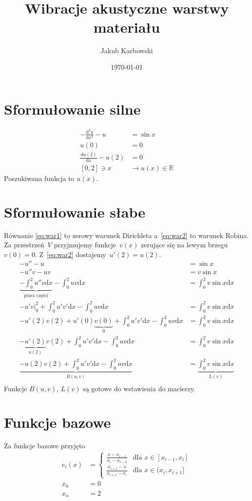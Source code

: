 \documentclass[12pt,a4paper]{mwart}
\begin{document}
\title{Wibracje akustyczne warstwy materiału}
\author{Jakub Karbowski}
\date{\today}
\maketitle


\section{Sformułowanie silne}
\begin{align}
    \label{eq:main}
    -\frac{\mathrm{d}^2u}{\mathrm{d}x^2} - u &= \sin x \\
    \label{eq:war1}
    u(0) &= 0 \\
    \label{eq:war2}
    \frac{\mathrm{d}u(2)}{\mathrm{d}x} - u(2) &= 0 \\
    [0,2] \ni x &\to u(x) \in \mathbb{R} \nonumber
\end{align}
Poszukiwana funkcja to $u(x)$.

\section{Sformułowanie słabe}
Równanie \eqref{eq:war1} to zerowy warunek Dirichleta
a~\eqref{eq:war2} to warunek Robina.
Za przestrzeń~$V$ 
przyjmujemy funkcje~$v(x)$ zerujące się na lewym brzegu
$v(0)=0$.
Z~\eqref{eq:war2} dostajemy~$u'(2)=u(2)$.
\begin{align*}
    -u'' - u &= \sin x \\
    -u''v - uv &= v\sin x \\
    \underbrace{-\int_0^2u''v\mathrm{d}x}_\text{przez części} - \int_0^2uv\mathrm{d}x &= \int_0^2v\sin x\mathrm{d}x \\
    -u'v\big|_0^2 + \int_0^2u'v'\mathrm{d}x - \int_0^2uv\mathrm{d}x &= \int_0^2v\sin x\mathrm{d}x \\
    -u'(2)v(2) + u'(0)\underbrace{v(0)}_0 + \int_0^2u'v'\mathrm{d}x - \int_0^2uv\mathrm{d}x &= \int_0^2v\sin x\mathrm{d}x \\
    -\underbrace{u'(2)}_{u(2)}v(2) + \int_0^2u'v'\mathrm{d}x - \int_0^2uv\mathrm{d}x &= \int_0^2v\sin x\mathrm{d}x \\
    \underbrace{-u(2)v(2) + \int_0^2u'v'\mathrm{d}x - \int_0^2uv\mathrm{d}x}_{B(u,v)} &= \underbrace{\int_0^2v\sin x\mathrm{d}x}_{L(v)} \\
\end{align*}
Funkcje $B(u,v)$, $L(v)$ są gotowe do wstawienia do macierzy.

\section{Funkcje bazowe}
Za funkcje bazowe przyjęto
\begin{align*}
    e_i(x) &= \begin{cases}
        \frac{x - x_{i-1}}{x_i - x_{i-1}} & \text{dla $x\in[x_{i-1},x_i]$} \\
        \frac{x_{i+1} - x}{x_{i+1} - x_i} & \text{dla $x\in(x_i,x_{i+1}]$}
    \end{cases} \\
    x_0 &= 0 \\
    x_n &= 2
\end{align*}
\end{document}
